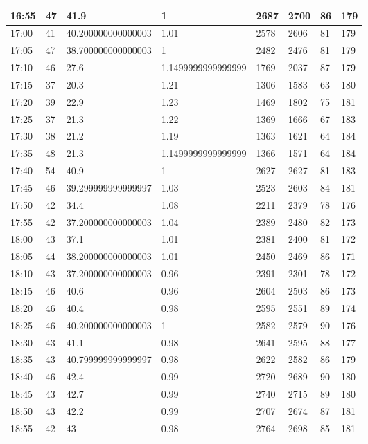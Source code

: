 \documentclass[
]{book}
\begin{document}
\begin{tabular}{l|l|l|l|l|l|l|l}
\hline
16:55 & 47 & 41.9 & 1 & 2687 & 2700 & 86 & 179\\
\hline
17:00 & 41 & 40.200000000000003 & 1.01 & 2578 & 2606 & 81 & 179\\
\hline
17:05 & 47 & 38.700000000000003 & 1 & 2482 & 2476 & 81 & 179\\
\hline
17:10 & 46 & 27.6 & 1.1499999999999999 & 1769 & 2037 & 87 & 179\\
\hline
17:15 & 37 & 20.3 & 1.21 & 1306 & 1583 & 63 & 180\\
\hline
17:20 & 39 & 22.9 & 1.23 & 1469 & 1802 & 75 & 181\\
\hline
17:25 & 37 & 21.3 & 1.22 & 1369 & 1666 & 67 & 183\\
\hline
17:30 & 38 & 21.2 & 1.19 & 1363 & 1621 & 64 & 184\\
\hline
17:35 & 48 & 21.3 & 1.1499999999999999 & 1366 & 1571 & 64 & 184\\
\hline
17:40 & 54 & 40.9 & 1 & 2627 & 2627 & 81 & 183\\
\hline
17:45 & 46 & 39.299999999999997 & 1.03 & 2523 & 2603 & 84 & 181\\
\hline
17:50 & 42 & 34.4 & 1.08 & 2211 & 2379 & 78 & 176\\
\hline
17:55 & 42 & 37.200000000000003 & 1.04 & 2389 & 2480 & 82 & 173\\
\hline
18:00 & 43 & 37.1 & 1.01 & 2381 & 2400 & 81 & 172\\
\hline
18:05 & 44 & 38.200000000000003 & 1.01 & 2450 & 2469 & 86 & 171\\
\hline
18:10 & 43 & 37.200000000000003 & 0.96 & 2391 & 2301 & 78 & 172\\
\hline
18:15 & 46 & 40.6 & 0.96 & 2604 & 2503 & 86 & 173\\
\hline
18:20 & 46 & 40.4 & 0.98 & 2595 & 2551 & 89 & 174\\
\hline
18:25 & 46 & 40.200000000000003 & 1 & 2582 & 2579 & 90 & 176\\
\hline
18:30 & 43 & 41.1 & 0.98 & 2641 & 2595 & 88 & 177\\
\hline
18:35 & 43 & 40.799999999999997 & 0.98 & 2622 & 2582 & 86 & 179\\
\hline
18:40 & 46 & 42.4 & 0.99 & 2720 & 2689 & 90 & 180\\
\hline
18:45 & 43 & 42.7 & 0.99 & 2740 & 2715 & 89 & 180\\
\hline
18:50 & 43 & 42.2 & 0.99 & 2707 & 2674 & 87 & 181\\
\hline
18:55 & 42 & 43 & 0.98 & 2764 & 2698 & 85 & 181\\

\end{tabular}
\end{document}
